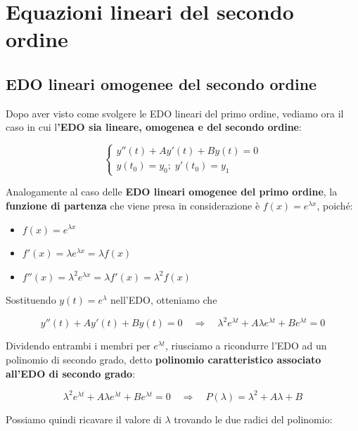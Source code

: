 \documentclass[a4paper, 12pt]{report}
\begin{document}
    \quad

    \section{Equazioni lineari del secondo ordine}
    
    \subsection{EDO lineari omogenee del secondo ordine}
    
    Dopo aver visto come svolgere le EDO lineari del primo ordine, vediamo ora il caso in cui l\textbf{'EDO sia lineare, omogenea e del secondo ordine}:
    
    $$
    \left \{ \begin{array}{l}
    y''(t) + Ay'(t) + By(t) = 0 \\
    y(t_0) = y_0; \; y'(t_0) = y_1
    \end{array}\right .
    $$
    
    Analogamente al caso delle \textbf{EDO lineari omogenee del primo ordine}, la \textbf{funzione di partenza} che viene presa in considerazione è $f(x) = e^{\lambda x}$, poiché:
    
    \begin{itemize}
        \item $f(x) = e^{\lambda x}$
        \item $f'(x) = \lambda e^{\lambda x} = \lambda f(x)$
        \item $f''(x) = \lambda^2 e^{\lambda x} = \lambda f'(x) = \lambda^2 f(x)$
    \end{itemize}
    
    \quad
    
    Sostituendo $y(t) = e^{\lambda}$ nell'EDO, otteniamo che
    
    \[ y''(t) + Ay'(t) + By(t) = 0 \quad \Longrightarrow \quad \lambda^2 e^{\lambda t} + A\lambda e^{\lambda t} + Be^{\lambda t} = 0\]
    
    Dividendo entrambi i membri per $e^{\lambda t}$, riusciamo a ricondurre l'EDO ad un polinomio di secondo grado, detto \textbf{polinomio caratteristico associato all'EDO di secondo grado}:
    
    \[  \lambda^2e^{\lambda t} + A\lambda e^{\lambda t} + Be^{\lambda t} = 0 \quad \Longrightarrow \quad P(\lambda) = \lambda^2  + A\lambda + B\]
    
    Possiamo quindi ricavare il valore di $\lambda$ trovando le due radici del polinomio:
    
\end{document}
